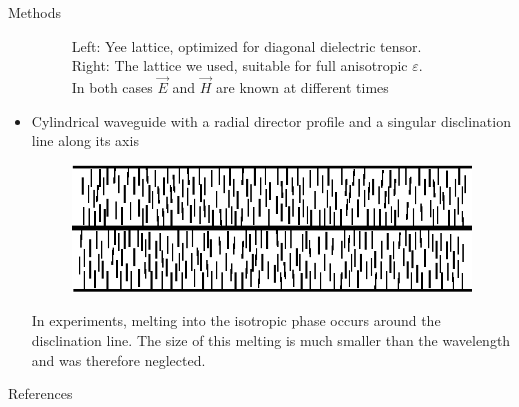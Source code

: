 \documentclass{beamer}
\newlength{\wideitemsep}
\let\olditem\item
\renewcommand{\item}{\setlength{\itemsep}{\wideitemsep}\olditem}
\newcommand{\blockpadding}{
  \rule[-0.6ex]{0pt}{2.5ex}
}
\begin{document}
\begin{columns}[t]
\begin{column}{.36\textwidth}
\begin{block}{\blockpadding Methods}
\begin{itemize}
\begin{figure}[h]
{}
\label{fig:lattice}
\caption{{\color{dark} Left:} Yee lattice, optimized for diagonal dielectric tensor. \\{\color{dark} Right:} The lattice we used, suitable for full anisotropic $\varepsilon$. \\In both cases $\vec E$ and $\vec H$ are known at different times}
\end{figure}

\item Cylindrical waveguide with a radial director profile and a singular disclination line along its axis \\
\begin{figure}[h]
\centering
\includegraphics[width=.5\textwidth]{../Magisterij/Slike/director-profile-radial}
\end{figure}
In experiments, melting into the isotropic phase occurs around the disclination line. 
The size of this melting is much smaller than the wavelength and was therefore neglected. 

 \end{itemize}
 \end{block}
 
 \begin{block}{\blockpadding References}
  
 \end{block}


 \end{column}
 

\end{columns}
\end{document}

